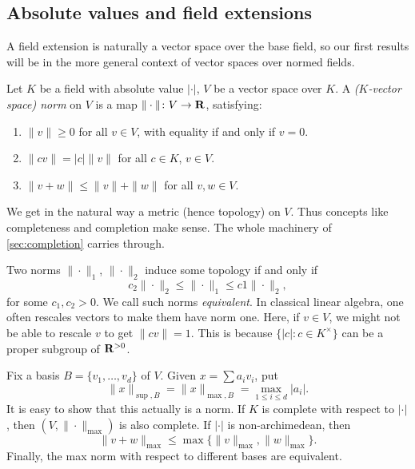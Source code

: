\subsection{Absolute values and field extensions}\label{sec:abs-val-field-ext}

A field extension is naturally a vector space over the base field, so our 
first results will be in the more general context of vector spaces over 
normed fields. 

\begin{definition}
Let $K$ be a field with absolute value $|\cdot|$, $V$ be a vector space over 
$K$. A \emph{($K$-vector space) norm} on $V$ is a map 
$\|\cdot\|\colon V\to \mathbf{R}$, satisfying: 
\begin{enumerate}
\item 
$\|v\|\geqslant 0$ for all $v\in V$, with equality if and only if $v=0$. 

\item
$\|c v\| = |c|\|v\|$ for all $c\in K$, $v\in V$. 

\item
$\|v+w\|\leqslant \|v\|+\|w\|$ for all $v,w\in V$. 
\end{enumerate}
\end{definition}

We get in the natural way a metric (hence topology) on $V$. Thus concepts like 
completeness and completion make sense. The whole machinery of 
\autoref{sec:completion} carries through. 

Two norms $\|\cdot\|_1$, $\|\cdot\|_2$ induce some topology if and only if 
\[
  c_2 \|\cdot\|_2 \leqslant \|\cdot\|_1 \leqslant c1 \|\cdot\|_2 ,
\]
for some $c_1,c_2>0$. We call such norms \emph{equivalent}. 
In classical linear algebra, one often rescales vectors 
to make them have norm one. Here, if $v\in V$, we might not be able to 
rescale $v$ to get $\|cv\|=1$. This is because $\{|c|\colon c\in K^\times\}$ 
can be a proper subgroup of $\mathbf{R}^{>0}$. 

\begin{example}
Fix a basis $B=\{v_1,\dots,v_d\}$ of $V$. Given $x=\sum a_i v_i$, put 
\[
  \|x\|_{\sup,B} = \|x\|_{\max,B} = \max_{1\leqslant i\leqslant d} |a_i| .
\]
It is easy to show that this actually is a norm. If $K$ is complete with 
respect to $|\cdot|$, then $(V,\|\cdot\|_{\max})$ is also complete. If 
$|\cdot|$ is non-archimedean, then 
\[
  \|v+w\|_{\max} \leqslant \max\{\|v\|_{\max},\|w\|_{\max}\} .
\]
Finally, the max norm with respect to different bases are equivalent. 
\end{example}

